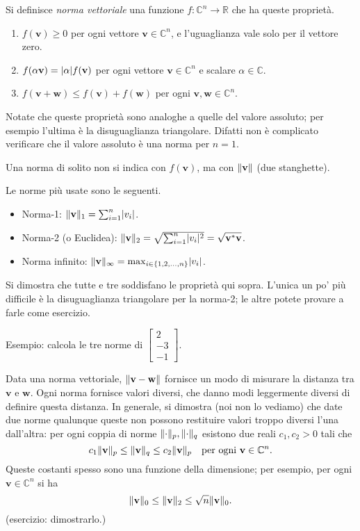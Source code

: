 \documentclass[a4paper]{report}
\DeclarePairedDelimiter{\abs}{\lvert}{\rvert}
\DeclarePairedDelimiter{\norm}{\lVert}{\rVert}
\theoremstyle{definiton}
\theoremstyle{remark}
\begin{document}
Si definisce \emph{norma vettoriale} una funzione $f: \mathbb{C}^n \to \mathbb{R}$ che ha queste proprietà.
\begin{enumerate}
    \item $f(\mathbf{v}) \geq 0$ per ogni vettore $\mathbf{v}\in\mathbb{C}^n$, e l'uguaglianza vale solo per il vettore zero.
    \item $f(\alpha \mathbf{v}) = \abs{\alpha} f(\mathbf{v})$ per ogni vettore $\mathbf{v}\in\mathbb{C}^n$ e scalare $\alpha \in \mathbb{C}$.
    \item $f(\mathbf{v}+\mathbf{w}) \leq f(\mathbf{v}) + f(\mathbf{w})$ per ogni $\mathbf{v},\mathbf{w}\in\mathbb{C}^n$.
\end{enumerate}
Notate che queste proprietà sono analoghe a quelle del valore assoluto; per esempio l'ultima è la disuguaglianza triangolare. Difatti non è complicato verificare che il valore assoluto è una norma per $n=1$.

Una norma di solito non si indica con $f(\mathbf{v})$, ma con $\norm{\mathbf{v}}$ (due stanghette).

Le norme più usate sono le seguenti.

\begin{itemize}
    \item Norma-1: $\norm{\mathbf{v}}_1 = \sum_{i=1}^n \abs{v_i}$.
    \item Norma-2 (o Euclidea): $\norm{\mathbf{v}}_2 = \sqrt{\sum_{i=1}^n \abs{v_i}^2} = \sqrt{\mathbf{v}^*\mathbf{v}}$.
    \item Norma infinito: $\norm{\mathbf{v}}_\infty = \max_{i\in \{1,2,\dots,n\}} \abs{v_i}$.
\end{itemize}
Si dimostra che tutte e tre soddisfano le proprietà qui sopra. L'unica un po' più difficile è la disuguaglianza triangolare per la norma-2; le altre potete provare a farle come esercizio.

Esempio: calcola le tre norme di $\begin{bmatrix}
    2\\-3\\-1
\end{bmatrix}$.

Data una norma vettoriale, $\norm{\mathbf{v}-\mathbf{w}}$ fornisce un modo di misurare la distanza tra $\mathbf{v}$ e $\mathbf{w}$. Ogni norma fornisce valori diversi, che danno modi leggermente diversi di definire questa distanza. In generale, si dimostra (noi non lo vediamo) che date due norme qualunque queste non possono restituire valori troppo diversi l'una dall'altra: per ogni coppia di norme $\norm{\cdot}_p,\norm{\cdot}_q$ esistono due reali $c_1,c_2 > 0$ tali che
\[
c_1\norm{\mathbf{v}}_p \leq \norm{\mathbf{v}}_q \leq c_2 \norm{\mathbf{v}}_p \quad \text{per ogni $\mathbf{v}\in\mathbb{C}^n$}.
\]
Queste costanti spesso sono una funzione della dimensione; per esempio, per ogni $\mathbf{v}\in\mathbb{C}^n$ si ha
\[
\norm{\mathbf{v}}_0 \leq \norm{\mathbf{v}}_2 \leq \sqrt{n}\norm{\mathbf{v}}_0.
\]
(esercizio: dimostrarlo.)
\end{document}
